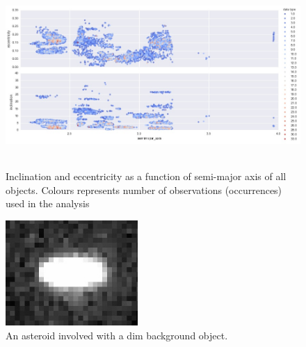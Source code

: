 \documentclass[iop,apj]{emulateapj}
\begin{document}
\begin{figure}[!htb]
    \centering
    \includegraphics[height=7cm]{graphs/a_e_i_occur.png}
    \caption{Inclination and eccentricity as a function of semi-major axis of all objects. Colours represents number of observations (occurrences) used in the analysis}\label{fig:2}
\end{figure}

\begin{figure}[!htb]
    \centering
    \includegraphics[height=4cm]{images/background_gal.jpeg}
    \caption{An asteroid involved with a dim background object. }\label{fig:3}
\end{figure}
\end{document}
